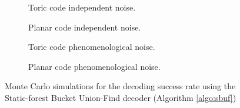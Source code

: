 \begin{figure}[htbp]
  \centering
  \begin{subfigure}[b]{0.49\textwidth}
      \begin{adjustbox}{Clip=0 1em 0 0}
        
      \end{adjustbox}
      \caption{Toric code independent noise.}
  \end{subfigure}
  \begin{subfigure}[b]{0.49\textwidth}
      \begin{adjustbox}{Clip=0 1em 0 0}
        
      \end{adjustbox}
      \caption{Planar code independent noise.}
  \end{subfigure}
  \begin{subfigure}[b]{0.49\textwidth}
      \begin{adjustbox}{Clip=0 1em 0 0}
        
      \end{adjustbox}
      \caption{Toric code phenomenological noise.}
  \end{subfigure}
  \begin{subfigure}[b]{0.49\textwidth}
      \begin{adjustbox}{Clip=0 1em 0 0}
        
      \end{adjustbox}
      \caption{Planar code phenomenological noise.}
  \end{subfigure}
  \caption{Monte Carlo simulations for the decoding success rate using the Static-forest Bucket Union-Find decoder (Algorithm \ref{algo:sbuf})}
  \label{fig:threshold_sbuf}
\end{figure}


